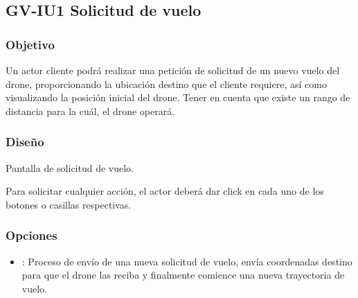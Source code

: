 %

\subsection{GV-IU1 Solicitud de vuelo}

\subsubsection{Objetivo}
	Un actor cliente podrá realizar una petición de solicitud de un nuevo 
vuelo del drone, proporcionando la ubicación destino que el cliente requiere, 
así como visualizando la posición inicial del drone. Tener en cuenta que existe 
un rango de distancia para la cuál, el drone operará.

\subsubsection{Diseño}

{Pantalla de solicitud de vuelo.}

	Para solicitar cualquier acción, el actor deberá dar click en cada uno 
de los botones o casillas respectivas.

\subsubsection{Opciones}
\begin{itemize}
	\item {}: Proceso de envío de una nueva 
	solicitud de vuelo, envía coordenadas destino para que el drone las 
	reciba y finalmente comience una nueva trayectoria de vuelo.
\end{itemize}
